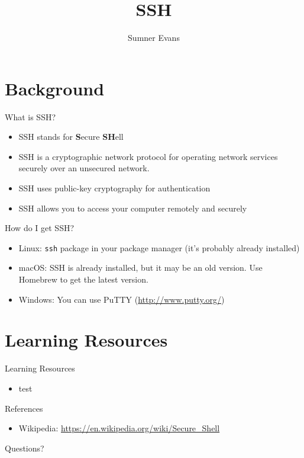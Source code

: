 \documentclass{lug}
\title{SSH}
\author{Sumner Evans}
\institute{Mines Linux Users Group}
\begin{document}
\section{Background}

\begin{frame}{What is SSH?}
    \begin{itemize}[<+->]
        \item SSH stands for \textbf{S}ecure \textbf{SH}ell
        \item SSH is a cryptographic network protocol for operating network
            services securely over an unsecured network.
        \item SSH uses public-key cryptography for authentication
        \item SSH allows you to access your computer remotely and securely
    \end{itemize}
\end{frame}

\begin{frame}{How do I get SSH?}
    \begin{itemize}
        \item Linux: \texttt{ssh} package in your package manager (it's probably
            already installed)
        \item macOS: SSH is already installed, but it may be an old version. Use
            Homebrew to get the latest version.
        \item Windows: You can use PuTTY (\url{http://www.putty.org/})
    \end{itemize}
\end{frame}

\section{Learning Resources}

\begin{frame}{Learning Resources}
    \begin{itemize}[<+->]
        \item test
    \end{itemize}
\end{frame}

\begin{frame}{References}
    \begin{itemize}
        \item Wikipedia: \url{https://en.wikipedia.org/wiki/Secure_Shell}
    \end{itemize}
\end{frame}

\begin{frame}[standout]
    \Huge
    Questions?
\end{frame}
\end{document}
